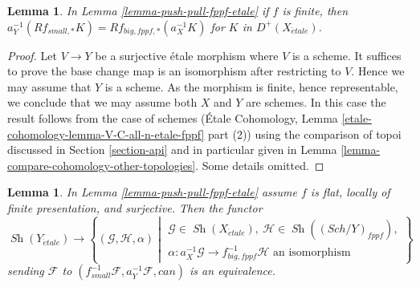\documentclass{stacks-project}
\theoremstyle{plain}
\newtheorem{lemma}[subsection]{Lemma}
\theoremstyle{definition}
\theoremstyle{remark}
\numberwithin{equation}{subsection}
\def\Sch{\mathit{Sch}}
\def\Sh{\mathop{\mathit{Sh}}\nolimits}
\def\etale{{\acute{e}tale}}
\begin{document}
\begin{lemma}
\label{lemma-finite-push-pull-fppf-etale}
In Lemma \ref{lemma-push-pull-fppf-etale} if $f$ is finite, then
$a_Y^{-1}(Rf_{small, *}K) = Rf_{big, fppf, *}(a_X^{-1}K)$
for $K$ in $D^+(X_\etale)$.
\end{lemma}

\begin{proof}
Let $V \to Y$ be a surjective \'etale morphism where $V$ is a scheme.
It suffices to prove the base change map is an isomorphism after
restricting to $V$. Hence we may assume that $Y$ is a scheme.
As the morphism is finite, hence representable, we conclude
that we may assume both $X$ and $Y$ are schemes. In this case
the result follows from the case of schemes
(\'Etale Cohomology, Lemma \ref{etale-cohomology-lemma-V-C-all-n-etale-fppf}
part (2)) using the comparison of topoi discussed in
Section \ref{section-api}
and in particular given in
Lemma \ref{lemma-compare-cohomology-other-topologies}.
Some details omitted.
\end{proof}

\begin{lemma}
\label{lemma-descent-sheaf-fppf-etale}
In Lemma \ref{lemma-push-pull-fppf-etale} assume
$f$ is flat, locally of finite presentation, and surjective.
Then the functor
$$
\Sh(Y_\etale) \longrightarrow
\left\{
(\mathcal{G}, \mathcal{H}, \alpha)
\middle|
\begin{matrix}
\mathcal{G} \in \Sh(X_\etale),\ \mathcal{H} \in \Sh((\Sch/Y)_{fppf}), \\
\alpha : a_X^{-1}\mathcal{G} \to f_{big, fppf}^{-1}\mathcal{H}
\text{ an isomorphism}
\end{matrix}
\right\}
$$
sending $\mathcal{F}$ to
$(f_{small}^{-1}\mathcal{F}, a_Y^{-1}\mathcal{F}, can)$ is an equivalence.
\end{lemma}
\end{document}
